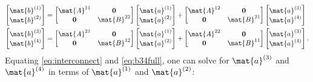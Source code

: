 \begin{subequations}
  \begin{align}
    \colvec{\mat{b}\one \\ \mat{b}\two}
    &=
    \begin{bmatrix}
      \mat{A}^{11} & \0 \\
      \0 & \mat{B}^{22}
    \end{bmatrix}
    \colvec{\mat{a}\one \\ \mat{a}\two}
    +
    \begin{bmatrix}
      \mat{A}^{12} & \0 \\
      \0 & \mat{B}^{21}
    \end{bmatrix}
    \colvec{\mat{a}\three \\ \mat{a}\four}
    \label{eq:b12full}
    \\
    \colvec{\mat{b}\three \\ \mat{b}\four}
    &=
    \begin{bmatrix}
      \mat{A}^{21} & \0 \\
      \0 & \mat{B}^{12}
    \end{bmatrix}
    \colvec{\mat{a}\one \\ \mat{a}\two}
    +
    \begin{bmatrix}
      \mat{A}^{22} & \0 \\
      \0 & \mat{B}^{11}
    \end{bmatrix}
    \colvec{\mat{a}\three \\ \mat{a}\four}.
    \label{eq:b34full}
  \end{align}
\end{subequations}
Equating \eqref{eq:interconnect} and \eqref{eq:b34full}, one can solve
for $\mat{a}\three$ and $\mat{a}\four$ in terms of $\mat{a}\one$ and
$\mat{a}\two$:
